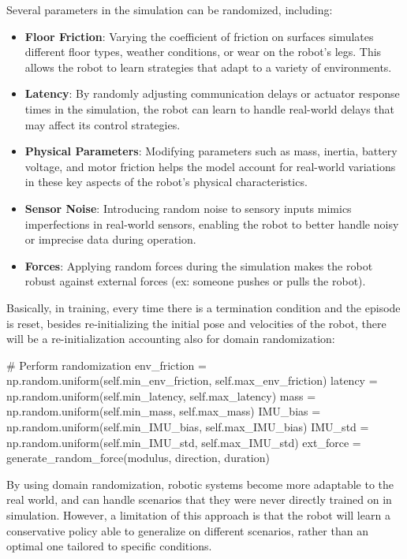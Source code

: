 Several parameters in the simulation can be randomized, including:

\begin{itemize}
	\item \textbf{Floor Friction}: Varying the coefficient of friction on surfaces simulates different floor types, weather conditions, or wear on the robot's legs. This allows the robot to learn strategies that adapt to a variety of environments.
	
	\item \textbf{Latency}: By randomly adjusting communication delays or actuator response times in the simulation, the robot can learn to handle real-world delays that may affect its control strategies.
	
	\item \textbf{Physical Parameters}: Modifying parameters such as mass, inertia, battery voltage, and motor friction helps the model account for real-world variations in these key aspects of the robot's physical characteristics.
	
	\item \textbf{Sensor Noise}: Introducing random noise to sensory inputs mimics imperfections in real-world sensors, enabling the robot to better handle noisy or imprecise data during operation.
	
	\item \textbf{Forces}: Applying random forces during the simulation makes the robot robust against external forces (ex: someone pushes or pulls the robot).
\end{itemize}

Basically, in training, every time there is a termination condition and the episode is reset, besides re-initializing the initial pose and velocities of the robot, there will be a re-initialization accounting also for domain randomization:

\begin{pythoncode}
	# Perform randomization
	env_friction = np.random.uniform(self.min_env_friction, self.max_env_friction)   
	latency = np.random.uniform(self.min_latency, self.max_latency)      
	mass = np.random.uniform(self.min_mass, self.max_mass)        
	IMU_bias = np.random.uniform(self.min_IMU_bias, self.max_IMU_bias) 
	IMU_std = np.random.uniform(self.min_IMU_std, self.max_IMU_std) 
	ext_force = generate_random_force(modulus, direction, duration)
\end{pythoncode}

By using domain randomization, robotic systems become more adaptable to the real world, and can handle scenarios that they were never directly trained on in simulation. However, a limitation of this approach is that the robot will learn a conservative policy able to generalize on different scenarios, rather than an optimal one tailored to specific conditions.

